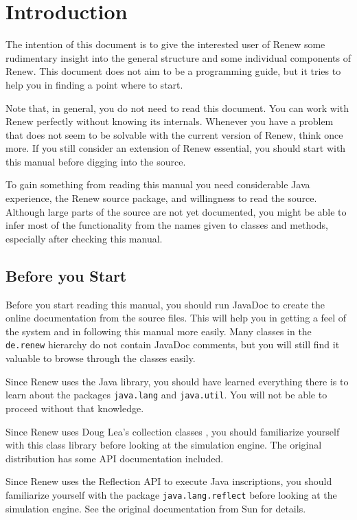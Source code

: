 \chapter{Introduction}

The intention of this document is to give the interested user of Renew
some rudimentary insight into the general structure
and some individual components of Renew. This document does not aim
to be a programming guide, but it tries to help you in
finding a point where to start.

Note that, in general, you do not need to read this document.
You can work with Renew perfectly without knowing its internals.
Whenever you have a problem that does not seem to be solvable
with the current version of Renew, think once more. If you still
consider an extension of Renew essential, you should start with this manual
before digging into the source.

To gain something from reading this manual you need considerable
Java experience, the Renew source package, and willingness to read
the source. Although large parts of the source are not yet documented,
you might be able to infer most of the functionality from the
names given to classes and methods, especially after checking this manual.



\section{Before you Start}

Before you start reading this manual, you should run JavaDoc to create
the online documentation from the source files. This will help you
in getting a feel of the system and in following this manual
more easily. Many classes in the \texttt{de.renew}
hierarchy do not contain JavaDoc comments, but you will still find it
valuable to browse through the classes easily.

Since Renew uses the Java library, you should have learned
everything there is to learn about the packages
\texttt{java.lang} and \texttt{java.util}. You will not be able to
proceed without that knowledge.

Since Renew uses Doug Lea's collection classes \cite{Lea98},
you should familiarize yourself with this class library before
looking at the simulation engine.
The original distribution has some API documentation included.

Since Renew uses the Reflection API to execute Java inscriptions,
you should familiarize yourself with the package
\texttt{java.lang.reflect} before
looking at the simulation engine.
See the original documentation from Sun for details.

